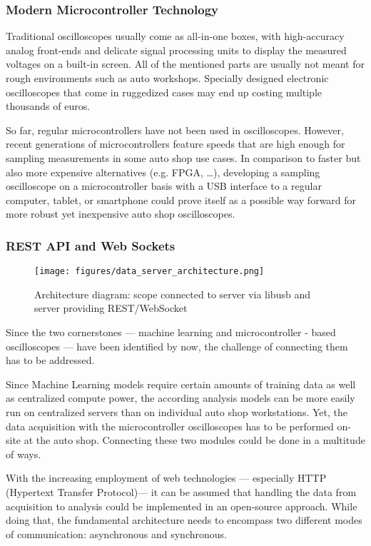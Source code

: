 \subsubsection{Modern Microcontroller Technology}
Traditional oscilloscopes usually come as all-in-one boxes, with high-accuracy analog front-ends and delicate signal processing units to display the measured voltages on a built-in screen. 
All of the mentioned parts are usually not meant for rough environments such as auto workshops. 
Specially designed electronic oscilloscopes that come in ruggedized cases may end up costing multiple thousands of euros.

So far, regular microcontrollers have not been used in oscilloscopes. 
However, recent generations of microcontrollers feature speeds that are high enough for sampling measurements in some auto shop use cases. 
In comparison to faster but also more expensive alternatives (e.g. FPGA, …), developing a sampling oscilloscope on a microcontroller basis with a USB interface to a regular computer, tablet, 
or smartphone could prove itself as a possible way forward for more robust yet inexpensive auto shop oscilloscopes.

\subsubsection{REST API and Web Sockets}
\begin{figure}[ht]
  \centering
  \texttt{[image: figures/data\_server\_architecture.png]}
  \caption{Architecture diagram: scope connected to server via libusb and server providing REST/WebSocket}
  \label{fig:data-server}
\end{figure}
Since the two cornerstones — machine learning and microcontroller - based oscilloscopes — have been identified by now, the challenge of connecting them has to be addressed.

Since Machine Learning models require certain amounts of training data as well as centralized compute power, the according analysis models can be more easily run on centralized servers than on individual auto shop workstations. 
Yet, the data acquisition with the microcontroller oscilloscopes has to be performed on-site at the auto shop. 
Connecting these two modules could be done in a multitude of ways.

With the increasing employment of web technologies — especially HTTP (Hypertext Transfer Protocol)— it can be assumed that handling the data from acquisition to analysis could be implemented in an open-source approach. 
While doing that, the fundamental architecture needs to encompass two different modes of communication: asynchronous and synchronous.

